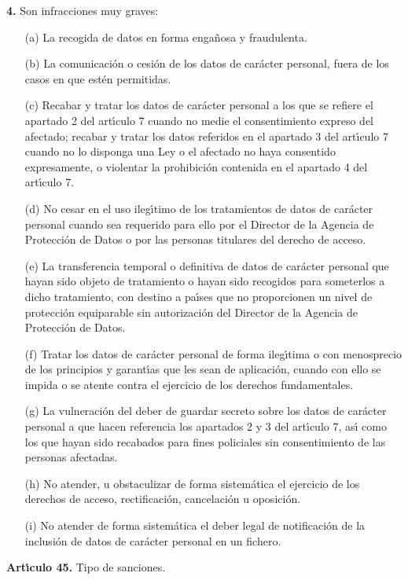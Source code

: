 {\bf 4.} Son infracciones muy graves: \begin{itemize} \item [(a)]
La recogida de datos en forma enga\~nosa y fraudulenta.  \item [(b)]
La comunicaci\'on o cesi\'on de los datos de car\'acter personal, fuera
de los casos en que est\'en permitidas.  \item [(c)] Recabar y tratar
los datos de car\'acter personal a los que se refiere el apartado 2 del
art\'{\i}culo 7 cuando no medie el consentimiento expreso del afectado;
recabar y tratar los datos referidos en el apartado 3 del art\'{\i}culo
7 cuando no lo disponga una Ley o el afectado no haya consentido
expresamente, o violentar la prohibici\'on contenida en el apartado 4 del
art\'{\i}culo 7.  \item [(d)] No cesar en el uso ileg\'{\i}timo de los
tratamientos de datos de car\'acter personal cuando sea requerido para
ello por el Director de la Agencia de Protecci\'on de Datos o por las
personas titulares del derecho de acceso.  \item [(e)] La transferencia
temporal o definitiva de datos de car\'acter personal que hayan sido
objeto de tratamiento o hayan sido recogidos para someterlos a dicho
tratamiento, con destino a pa\'{\i}ses que no proporcionen un nivel de
protecci\'on equiparable sin autorizaci\'on del Director de la Agencia
de Protecci\'on de Datos.  \item [(f)] Tratar los datos de car\'acter
personal de forma ileg\'{\i}tima o con menosprecio de los principios
y garant\'{\i}as que les sean de aplicaci\'on, cuando con ello se
impida o se atente contra el ejercicio de los derechos fundamentales.
\item [(g)] La vulneraci\'on del deber de guardar secreto sobre los
datos de car\'acter personal a que hacen referencia los apartados 2
y 3 del art\'{\i}culo 7, as\'{\i} como los que hayan sido recabados
para fines policiales sin consentimiento de las personas afectadas.
\item [(h)] No atender, u obstaculizar de forma sistem\'atica el
ejercicio de los derechos de acceso, rectificaci\'on, cancelaci\'on
u oposici\'on.  \item [(i)] No atender de forma sistem\'atica el deber
legal de notificaci\'on de la inclusi\'on de datos de car\'acter personal
en un fichero.  \end{itemize} \vspace{0.3cm} {\large {\bf Art\'{\i}culo
45.} Tipo de sanciones.}

